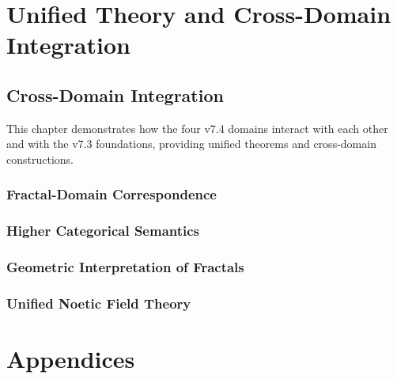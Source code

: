 \documentclass[11pt,twoside,openright]{book}
\theoremstyle{definition}
\theoremstyle{plain}
\theoremstyle{remark}
\begin{document}


\part{Unified Theory and Cross-Domain Integration}
\label{part:unified}

\chapter{Cross-Domain Integration}
\label{ch:cross-domain}

\begin{tcolorbox}[colback=green!5!white,colframe=green!75!black,title=\textbf{Integration Chapter}]
This chapter demonstrates how the four v7.4 domains interact with each other and with the v7.3 foundations, providing unified theorems and cross-domain constructions.
\end{tcolorbox}

\section{Fractal-Domain Correspondence}

\section{Higher Categorical Semantics}

\section{Geometric Interpretation of Fractals}

\section{Unified Noetic Field Theory}

\part{Appendices}
\label{part:appendices}
\end{document}
